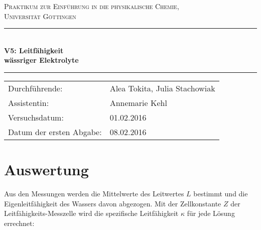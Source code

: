 \documentclass[12pt,a4paper,titlepage,headinclude,bibtotoc]{scrartcl}
\begin{document}
\begin{titlepage}
\centering
\textsc{\Large Praktikum zur Einführung in die physikalische Chemie,\\[1.5ex] Universität Göttingen}

\vspace*{2cm}

\rule{\textwidth}{1pt}\\[0.5cm]
{\huge \bfseries
  V5: Leitfähigkeit\\[1.5ex]
  wässriger Elektrolyte}\\[0.5cm]
\rule{\textwidth}{1pt}

\vspace*{1cm}


\begin{Large}
\begin{tabular}{ll}
Durchführende: &  Alea Tokita, Julia Stachowiak\\
Assistentin: & Annemarie Kehl\\
 Versuchsdatum: & 01.02.2016\\
 Datum der ersten Abgabe: & 08.02.2016\\

\end{tabular}
\end{Large}

\vspace*{1.5cm}

\begin{Large}
\end{Large}

\end{titlepage}

\tableofcontents

\newpage






\section{Auswertung}

Aus den Messungen werden die Mittelwerte des Leitwertes $L$ bestimmt und die Eigenleitfähigkeit des Wassers davon abgezogen. Mit der Zellkonstante $Z$ der Leitfähigkeits-Messzelle wird die spezifische Leitfähigkeit $\kappa$ für jede Lösung errechnet:\\
\end{document}
